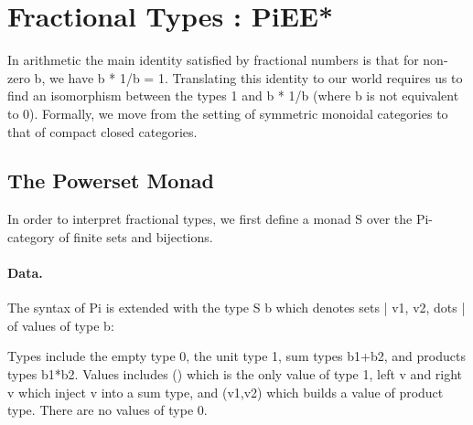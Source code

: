\documentclass[preprint]{sigplanconf}
\newcommand{\xcomment}[2]{\textbf{#1:~\textsl{#2}}}
\newcommand{\roshan}[1]{\xcomment{Roshan}{#1}}
\newtheorem{proposition}[theorem]{Proposition}
\begin{document}



\section{Fractional Types : {{PiEE*}} }
\label{sec:int}

In arithmetic the main identity satisfied by fractional numbers is that for
non-zero {{b}}, we have {{b * 1/b = 1}}. Translating this identity to our
world requires us to find an isomorphism between the types {{1}} and 
{{b * 1/b}} (where {{b}} is not equivalent to {{0}}). Formally, we move 
from the setting of symmetric monoidal categories to that of compact
closed categories. 

\subsection{The Powerset Monad} 

In order to interpret fractional types, we first define a monad {{S}} over
the {{Pi}}-category of finite sets and bijections.

\paragraph*{Data.} The syntax of {{Pi}} is extended with the type {{S b}}
which denotes sets {{ {| v1, v2, dots |} }} of values of type {{b}}:

Types include the empty type {{0}}, the unit type {{1}}, sum types {{b1+b2}},
and products types {{b1*b2}}.  Values includes {{()}} which is the only value
of type {{1}}, {{left v}} and {{right v}} which inject {{v}} into a sum type,
and {{(v1,v2)}} which builds a value of product type. There are no values of
type {{0}}.
\end{document}
